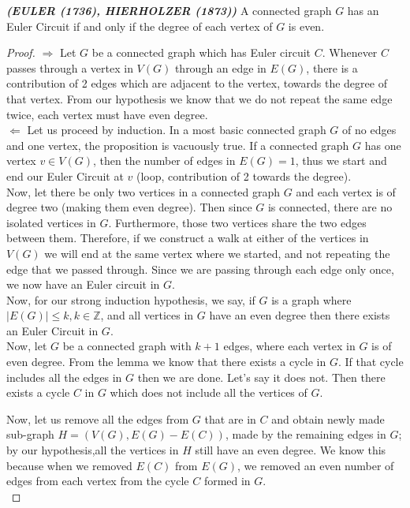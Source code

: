 \documentclass[12pt, fullpage]{article}
\newcommand{\Z}{\mathbb Z}
\begin{document}
	\textit{\textbf{(EULER (1736), HIERHOLZER (1873))}} A connected graph $G$ has an Euler Circuit if and only if the degree of each vertex of $G$ is even.
\begin{proof}
 	$\Longrightarrow$ Let $G$ be a connected graph which has Euler circuit $C$. Whenever $C$ passes through a vertex in $V(G)$ through an edge in $E(G)$, there is a contribution of 2 edges which are adjacent to the vertex, towards the degree of that vertex. From our hypothesis we know that we do not repeat the same edge twice, each vertex must have even degree. \\
 	
 	$\Longleftarrow$ Let us proceed by induction. In a most basic connected graph $G$ of no edges and one vertex, the proposition is vacuously true. If a connected graph $G$ has one vertex $v \in V(G)$, then the number of edges in $E(G) = 1$, thus we start and end our Euler Circuit at $v$ (loop, contribution of 2 towards the degree). \\
 	
 	Now, let there be only two vertices in a connected graph $G$ and each vertex is of degree two (making them even degree). Then since $G$ is connected, there are no isolated vertices in $G$. Furthermore, those two vertices share the two edges between them. Therefore, if we construct a walk at either of the vertices in $V(G)$ we will end at the same vertex where we started, and not repeating the edge that we passed through. Since we are passing through each edge only once, we now have an Euler circuit in $G$.\\ 
 	
 	Now, for our strong induction hypothesis, we say, if $G$ is a graph where $\vert E(G)\vert \leq k, k \in \Z$, and all vertices in $G$ have an even degree then there exists an Euler Circuit in $G$.\\
 	
 	 Now, let $G$ be a connected graph with $k+1$ edges, where each vertex in $G$ is of even degree. From the lemma we know that there exists a cycle in $G$. If that cycle includes all the edges in $G$ then we are done. Let's say it does not. Then there exists a cycle $C$ in $G$ which does not include all the vertices of $G$. 
 	 
 	 Now, let us remove all the edges from $G$ that are in $C$ and obtain newly made sub-graph $H = (V(G), E(G)-E(C))$, made by the remaining edges in $G$; by our hypothesis,all the vertices in $H$ still have an even degree. We know this because when we removed $E(C)$ from $E(G)$, we removed an even number of edges from each vertex from the cycle $C$ formed in $G$.\\
 	 

\end{proof}
\end{document}
